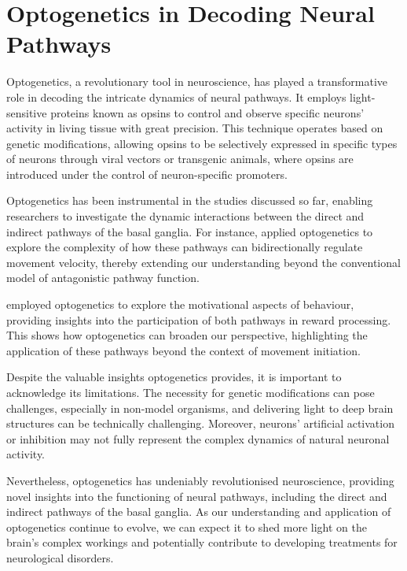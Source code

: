 \documentclass[10pt]{article}
\begin{document}
\begin{sloppypar}
  \section{Optogenetics in Decoding Neural Pathways}
  \label{sec:the-role-of-optogenetics-in-neural-pathways}

  Optogenetics, a revolutionary tool in neuroscience, has played a transformative role in decoding the intricate dynamics of neural pathways. It employs light-sensitive proteins known as opsins to control and observe specific neurons’ activity in living tissue with great precision. This technique operates based on genetic modifications, allowing opsins to be selectively expressed in specific types of neurons through viral vectors or transgenic animals, where opsins are introduced under the control of neuron-specific promoters.

  Optogenetics has been instrumental in the studies discussed so far, enabling researchers to investigate the dynamic interactions between the direct and indirect pathways of the basal ganglia. For instance, \cite{yttri_opponent_2016} applied optogenetics to explore the complexity of how these pathways can bidirectionally regulate movement velocity, thereby extending our understanding beyond the conventional model of antagonistic pathway function.

  \cite{guillaumin_experimental_2021} employed optogenetics to explore the motivational aspects of behaviour, providing insights into the participation of both pathways in reward processing. This shows how optogenetics can broaden our perspective, highlighting the application of these pathways beyond the context of movement initiation.

  Despite the valuable insights optogenetics provides, it is important to acknowledge its limitations. The necessity for genetic modifications can pose challenges, especially in non-model organisms, and delivering light to deep brain structures can be technically challenging. Moreover, neurons’ artificial activation or inhibition may not fully represent the complex dynamics of natural neuronal activity.

  Nevertheless, optogenetics has undeniably revolutionised neuroscience, providing novel insights into the functioning of neural pathways, including the direct and indirect pathways of the basal ganglia. As our understanding and application of optogenetics continue to evolve, we can expect it to shed more light on the brain’s complex workings and potentially contribute to developing treatments for neurological disorders.


\end{sloppypar}
\end{document}
